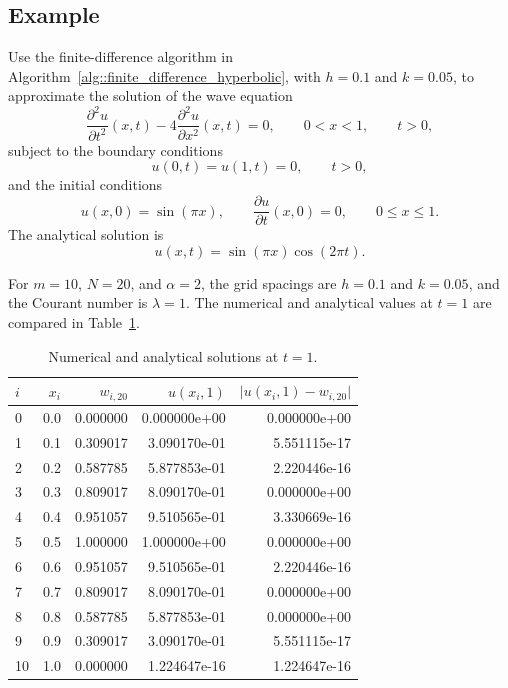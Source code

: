\documentclass[a4paper]{article}
\begin{document}
\subsection{Example}

Use the finite-difference algorithm in Algorithm~\ref{alg::finite_difference_hyperbolic}, with $h=0.1$ and $k=0.05$, to approximate the solution of the wave equation
\begin{equation}
\frac{\partial^2u}{\partial t^2}(x,t)-4\frac{\partial^2u}{\partial x^2}(x,t)=0,\qquad 0<x<1,
\qquad t>0,
\end{equation}
subject to the boundary conditions
\begin{equation*}
u(0,t)=u(1,t)=0,\qquad t>0,
\end{equation*}
and the initial conditions
\begin{equation}
u(x,0)=\sin(\pi x),\qquad \frac{\partial u}{\partial t}(x,0)=0,
\qquad 0\leq x\leq1.
\end{equation}
The analytical solution is
\begin{equation}
u(x,t)=\sin(\pi x)\cos(2\pi t).
\end{equation}

For $m=10$, $N=20$, and $\alpha=2$, the grid spacings are $h=0.1$ and $k=0.05$, and the Courant number is $\lambda=1$. The numerical and analytical values at $t=1$ are compared in Table~\ref{Tab::table_1}.

\begin{table}[ht]
\centering
\caption{Numerical and analytical solutions at $t=1$.}
\label{Tab::table_1}
\begin{tabular}{lrrrr}
\toprule
$i$&$x_i$&$w_{i,20}$&$u(x_i,1)$&$\lvert u(x_i,1)-w_{i,20}\rvert$\\
\midrule
0&0.0&0.000000&0.000000e+00&0.000000e+00\\
1&0.1&0.309017&3.090170e-01&5.551115e-17\\
2&0.2&0.587785&5.877853e-01&2.220446e-16\\
3&0.3&0.809017&8.090170e-01&0.000000e+00\\
4&0.4&0.951057&9.510565e-01&3.330669e-16\\
5&0.5&1.000000&1.000000e+00&0.000000e+00\\
6&0.6&0.951057&9.510565e-01&2.220446e-16\\
7&0.7&0.809017&8.090170e-01&0.000000e+00\\
8&0.8&0.587785&5.877853e-01&0.000000e+00\\
9&0.9&0.309017&3.090170e-01&5.551115e-17\\
10&1.0&0.000000&1.224647e-16&1.224647e-16\\
\bottomrule
\end{tabular}
\end{table}
\end{document}
